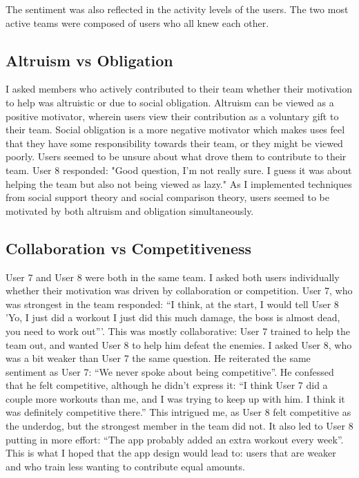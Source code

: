 \documentclass{l4proj}
\begin{document}
The sentiment was also reflected in the activity levels of the users. The two most active teams were composed of users who all knew each other.

\subsection{Altruism vs Obligation}
I asked members who actively contributed to their team whether their motivation to help was altruistic or due to social obligation. Altruism can be viewed as a positive motivator, wherein users view their contribution as a voluntary gift to their team. Social obligation is a more negative motivator which makes uses feel that they have some responsibility towards their team, or they might be viewed poorly. Users seemed to be unsure about what drove them to contribute to their team. User 8 responded: "Good question, I'm not really sure. I guess it was about helping the team but also not being viewed as lazy." As I implemented techniques from social support theory and social comparison theory, users seemed to be motivated by both altruism and obligation simultaneously.

\subsection{Collaboration vs Competitiveness}
User 7 and User 8 were both in the same team. I asked both users individually whether their motivation was driven by collaboration or competition. User 7, who was strongest in the team responded: ``I think, at the start, I would tell User 8 'Yo, I just did a workout I just did this much damage, the boss is almost dead, you need to work out'''. This was mostly collaborative: User 7 trained to help the team out, and wanted User 8 to help him defeat the enemies. I asked User 8, who was a bit weaker than User 7 the same question. He reiterated the same sentiment as User 7: ``We never spoke about being competitive''. He confessed that he felt competitive, although he didn't express it: ``I think User 7 did a couple more workouts than me, and I was trying to keep up with him. I think it was definitely competitive there.'' This intrigued me, as User 8 felt competitive as the underdog, but the strongest member in the team did not. It also led to User 8 putting in more effort: ``The app probably added an extra workout every week''. This is what I hoped that the app design would lead to: users that are weaker and who train less wanting to contribute equal amounts.
\end{document}
